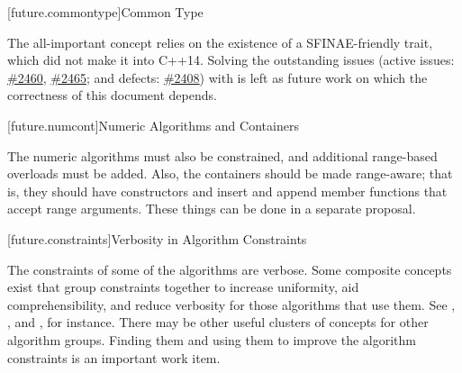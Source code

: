 [future.commontype]{Common Type}

\pnum
The all-important  concept relies on the existence of a SFINAE-friendly
 trait, which did not make it into C++14. Solving the outstanding issues
(active issues:
\href{https://cplusplus.github.io/LWG/lwg-active.html#2460}{\#2460},
\href{https://cplusplus.github.io/LWG/lwg-active.html#2465}{\#2465}; and defects:
\href{https://cplusplus.github.io/LWG/lwg-defects.html#2408}{\#2408}) with  is
left as future work on which the correctness of this document depends.

[future.numcont]{Numeric Algorithms and Containers}

\pnum
The numeric algorithms must also be constrained, and additional range-based overloads must be added.
Also, the containers should be made range-aware; that is, they should have constructors and insert
and append member functions that accept range arguments. These things can be done in a separate
proposal.

[future.constraints]{Verbosity in Algorithm Constraints}

\pnum
The constraints of some of the algorithms are verbose. Some composite concepts exist that group
constraints together to increase uniformity, aid comprehensibility, and reduce verbosity for those
algorithms that use them. See , , and , for
instance. There may be other useful clusters of concepts for other algorithm groups. Finding them
and using them to improve the algorithm constraints is an important work item.

